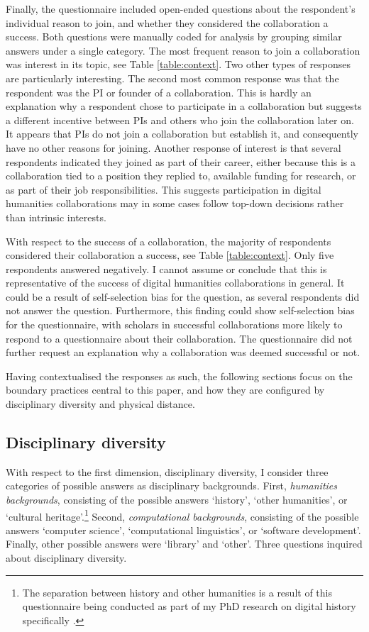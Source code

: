 \documentclass{article}
\begin{document}
Finally, the questionnaire included open-ended questions about the respondent's individual reason to join, and whether they considered the collaboration a success. Both questions were manually coded for analysis by grouping similar answers under a single category.
The most frequent reason to join a collaboration was interest in its topic, see Table \ref{table:context}.
Two other types of responses are particularly interesting. The second most common response was that the respondent was the PI or founder of a collaboration. This is hardly an explanation why a respondent chose to participate in a collaboration but suggests a different incentive between PIs and others who join the collaboration later on. It appears that PIs do not join a collaboration but establish it, and consequently have no other reasons for joining.
Another response of interest is that several respondents indicated they joined as part of their career, either because this is a collaboration tied to a position they replied to, available funding for research, or as part of their job responsibilities. 
This suggests participation in digital humanities collaborations may in some cases follow top-down decisions rather than intrinsic interests.

With respect to the success of a collaboration, the majority of respondents considered their collaboration a success, see Table \ref{table:context}. Only five respondents answered negatively.
I cannot assume or conclude that this is representative of the success of digital humanities collaborations in general.
It could be a result of self-selection bias for the question, as several respondents did not answer the question. Furthermore, this finding could show self-selection bias for the questionnaire, with scholars in successful collaborations more likely to respond to a questionnaire about their collaboration. The questionnaire did not further request an explanation why a collaboration was deemed successful or not.

Having contextualised the responses as such, the following sections focus on the boundary practices central to this paper, and how they are configured by disciplinary diversity and physical distance.

\subsection{Disciplinary diversity}
With respect to the first dimension, disciplinary diversity, I consider three categories of possible answers as disciplinary backgrounds.
First, \textit{humanities backgrounds}, consisting of the possible answers `history', `other humanities', or `cultural heritage'.\footnote{The separation between history and other humanities is a result of this questionnaire being conducted as part of my PhD research on digital history specifically \citep{kemman2019}.}
Second, \textit{computational backgrounds}, consisting of the possible answers `computer science', `computational linguistics', or `software development'.
Finally, other possible answers were `library' and `other'.
Three questions inquired about disciplinary diversity.
\end{document}
